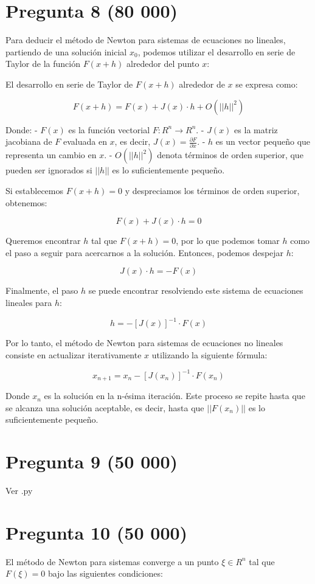 \documentclass[a4paper,12pt]{article}
\begin{document}
\section*{Pregunta 8 (80 000)}
Para deducir el método de Newton para sistemas de ecuaciones no lineales, partiendo de una solución inicial \( x_0 \), podemos utilizar el desarrollo en serie de Taylor de la función \( F(x + h) \) alrededor del punto \( x \):

El desarrollo en serie de Taylor de \( F(x + h) \) alrededor de \( x \) se expresa como:

\[ F(x + h) = F(x) + J(x) \cdot h + O(||h||^2) \]

Donde:
- \( F(x) \) es la función vectorial \( F : R^n \rightarrow R^n \).
- \( J(x) \) es la matriz jacobiana de \( F \) evaluada en \( x \), es decir, \( J(x) = \frac{\partial F}{\partial x} \).
- \( h \) es un vector pequeño que representa un cambio en \( x \).
- \( O(||h||^2) \) denota términos de orden superior, que pueden ser ignorados si \( ||h|| \) es lo suficientemente pequeño.

Si establecemos \( F(x + h) = 0 \) y despreciamos los términos de orden superior, obtenemos:

\[ F(x) + J(x) \cdot h = 0 \]

Queremos encontrar \( h \) tal que \( F(x + h) = 0 \), por lo que podemos tomar \( h \) como el paso a seguir para acercarnos a la solución. Entonces, podemos despejar \( h \):

\[ J(x) \cdot h = -F(x) \]

Finalmente, el paso \( h \) se puede encontrar resolviendo este sistema de ecuaciones lineales para \( h \):

\[ h = -[J(x)]^{-1} \cdot F(x) \]

Por lo tanto, el método de Newton para sistemas de ecuaciones no lineales consiste en actualizar iterativamente \( x \) utilizando la siguiente fórmula:

\[ x_{n+1} = x_n - [J(x_n)]^{-1} \cdot F(x_n) \]

Donde \( x_n \) es la solución en la n-ésima iteración. Este proceso se repite hasta que se alcanza una solución aceptable, es decir, hasta que \( ||F(x_n)|| \) es lo suficientemente pequeño.

\section*{Pregunta 9 (50 000)}Ver .py

\section*{Pregunta 10 (50 000)}
El método de Newton para sistemas converge a un punto \( \xi \in R^n \) tal que \( F(\xi) = 0 \) bajo las siguientes condiciones:
\end{document}
